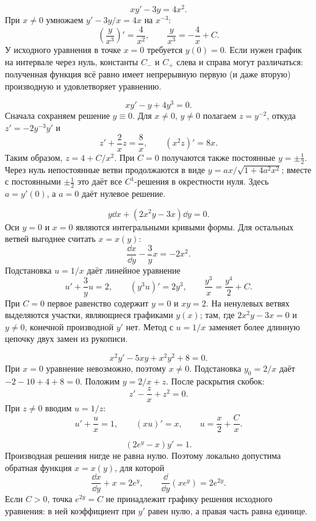 \[
 xy'-3y=4x^2.
\]
При $x\ne0$ умножаем $y'-3y/x=4x$ на $x^{-3}$:
\[
 \left(\frac{y}{x^3}\right)'=\frac4{x^2},\qquad
 \frac{y}{x^3}=-\frac4x+C.
\]
У исходного уравнения в точке $x=0$ требуется $y(0)=0$.
Если нужен график на интервале через нуль, константы $C_-$ и $C_+$
слева и справа могут различаться: полученная функция всё равно имеет
непрерывную первую (и даже вторую) производную и удовлетворяет уравнению.

\[
 xy'-y+4y^3=0.
\]
Сначала сохраняем решение $y\equiv0$. Для $x\ne0$, $y\ne0$
полагаем $z=y^{-2}$, откуда $z'=-2y^{-3}y'$ и
\[
 z'+\frac2x z=\frac8x,\qquad (x^2z)'=8x.
\]
Таким образом, $z=4+C/x^2$.
При $C=0$ получаются также постоянные $y=\pm\tfrac12$.
Через нуль непостоянные ветви продолжаются в виде
$y=ax/\sqrt{1+4a^2x^2}$; вместе с постоянными $\pm\tfrac12$
это даёт все $C^1$-решения в окрестности нуля. Здесь $a=y'(0)$,
а $a=0$ даёт нулевое решение.

\[
 y\dd x+(2x^2y-3x)\dd y=0.
\]
Оси $y=0$ и $x=0$ являются интегральными кривыми формы.
Для остальных ветвей выгоднее считать $x=x(y)$:
\[
 \frac{\dd x}{\dd y}-\frac3y x=-2x^2.
\]
Подстановка $u=1/x$ даёт линейное уравнение
\[
 u'+\frac3y u=2,\qquad (y^3u)'=2y^3,
 \qquad \frac{y^3}{x}=\frac{y^4}{2}+C.
\]
При $C=0$ первое равенство содержит $y=0$ и $xy=2$.
На ненулевых ветвях выделяются участки, являющиеся графиками $y(x)$;
там, где $2x^2y-3x=0$ и $y\ne0$, конечной производной $y'$ нет.
Метод с $u=1/x$ заменяет более длинную цепочку двух замен из рукописи.

\[
 x^2y'-5xy+x^2y^2+8=0.
\]
При $x=0$ уравнение невозможно, поэтому $x\ne0$.
Подстановка $y_0=2/x$ даёт $-2-10+4+8=0$.
Положим $y=2/x+z$. После раскрытия скобок:
\[
 z'-\frac zx+z^2=0.
\]
При $z\ne0$ вводим $u=1/z$:
\[
 u'+\frac ux=1,\qquad (xu)'=x,\qquad
 u=\frac x2+\frac Cx.
\]

\[
 (2e^y-x)y'=1.
\]
Производная решения нигде не равна нулю. Поэтому локально допустима
обратная функция $x=x(y)$, для которой
\[
 \frac{\dd x}{\dd y}+x=2e^y,
 \qquad \frac{\dd}{\dd y}(xe^y)=2e^{2y}.
\]
Если $C>0$, точка $e^{2y}=C$ не принадлежит графику решения исходного
уравнения: в ней коэффициент при $y'$ равен нулю, а правая часть равна единице.

